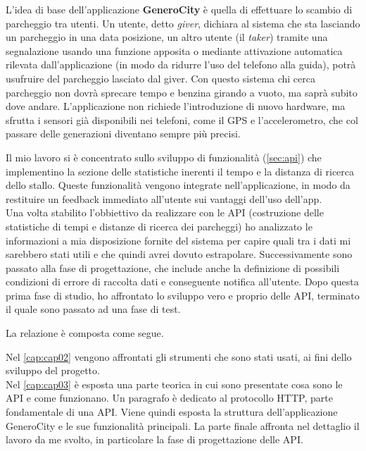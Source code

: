 \documentclass[italian, Lau, oneside, nodefaultfont, noexaminfo]{sapthesis}
\begin{document}
L'idea di base dell'applicazione \textbf{GeneroCity} \`e quella di effettuare lo scambio di parcheggio tra utenti. Un utente, detto \textit{giver}, dichiara al sistema che sta lasciando un parcheggio in una data posizione, un altro utente (il \textit{taker}) tramite una segnalazione usando una funzione apposita o mediante attivazione automatica rilevata dall'applicazione (in modo da ridurre l'uso del telefono alla guida), potr\`a usufruire del parcheggio lasciato dal giver. Con questo sistema chi cerca parcheggio non dovr\`a sprecare tempo e benzina  girando a vuoto, ma sapr\`a subito dove andare. L'applicazione non richiede l'introduzione di nuovo hardware, ma   sfrutta  i sensori gi\`a  disponibili  nei telefoni, come il GPS e l'accelerometro, che col passare delle generazioni diventano sempre pi\`u precisi.

Il mio lavoro si \`e concentrato sullo sviluppo di funzionalit\`a (\autoref{sec:api}) che implementino la sezione delle statistiche inerenti il tempo e  la distanza di ricerca dello stallo. Queste funzionalit\`a  vengono  integrate nell'applicazione, in modo da restituire un feedback immediato all'utente sui vantaggi dell'uso dell'app.
\\

 Una volta stabilito l'obbiettivo da realizzare con le API (costruzione delle statistiche di tempi e distanze di ricerca dei parcheggi) ho analizzato le informazioni a mia disposizione fornite del sistema per capire quali tra i dati mi sarebbero stati utili e che quindi  avrei dovuto estrapolare. Successivamente sono passato alla fase di progettazione, che include anche la definizione di possibili condizioni di errore di raccolta dati e conseguente notifica all'utente. Dopo questa prima fase di studio,  ho affrontato   lo sviluppo vero e proprio delle API, terminato il quale sono passato ad una fase di test. 
 
La relazione \`e composta come segue. 

Nel \autoref{cap:cap02} vengono affrontati gli strumenti che sono stati usati, ai fini dello  sviluppo del progetto.\\

Nel \autoref{cap:cap03} \`e  esposta una parte teorica in cui sono presentate cosa sono le API e come funzionano. Un paragrafo è dedicato al protocollo HTTP, parte fondamentale di una API. Viene quindi esposta la struttura dell'applicazione GeneroCity e le sue funzionalit\`a principali. La parte finale affronta nel dettaglio il lavoro da me svolto, in particolare la fase di progettazione delle API. \\
\end{document}
